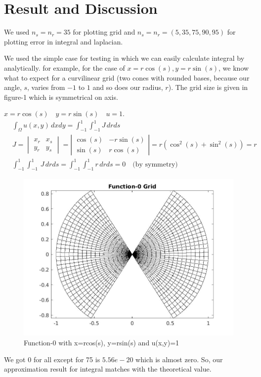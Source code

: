\documentclass{article}
\begin{document}
\section{Result and Discussion}
We used $n_s=n_r=35$ for plotting grid and $n_s=n_r=(5,35,75,90,95)$ for plotting error in integral and laplacian.

We used the simple case for testing in which we can easily calculate integral by analytically. for example, for the case of $x = r\cos(s),
y = r\sin(s)$, we know what to expect for a curvilinear grid (two cones
with rounded bases, because our angle, $s$, varies from $-1$ to $1$ and so
does our radius, $r$). The grid size is given in figure-1 which is symmetrical on axis.

$x = r\cos(s) \quad y = r\sin(s) \quad u = 1$.
\begin{align*}
    & \int_\Omega u(x, y) \, dx dy = \int_{-1}^1 \int_{-1}^1 J \, dr ds \\
    & J = \begin{vmatrix} x_r & x_s \\ y_r & y_s \end{vmatrix}
        = \left| \begin{array}{rr}
            \cos(s) & -r\sin(s) \\
            \sin(s) & r \cos(s)
        \end{array} \right|
        = r \left( \cos^2(s) + \sin^2(s) \right) = r \\
    & \int_{-1}^1 \int_{-1}^1 \, J \, dr ds
        = \int_{-1}^1 \int_{-1}^1 r \, dr ds
        = 0 \quad \text{(by symmetry)}
\end{align*}
\begin{figure}[h]
\centerline{\includegraphics[scale=.5,width=1.0\linewidth,height=0.5\textheight]{grid_0.jpeg}}

\caption{Function-0 with x=rcos(s), y=rsin(s) and u(x,y)=1 }
\label{fig}
\end{figure}
We got 0 for all except for 75 is $5.56e-20$ which is almost zero. So, our approximation result for integral matches with the theoretical value.
\end{document}
